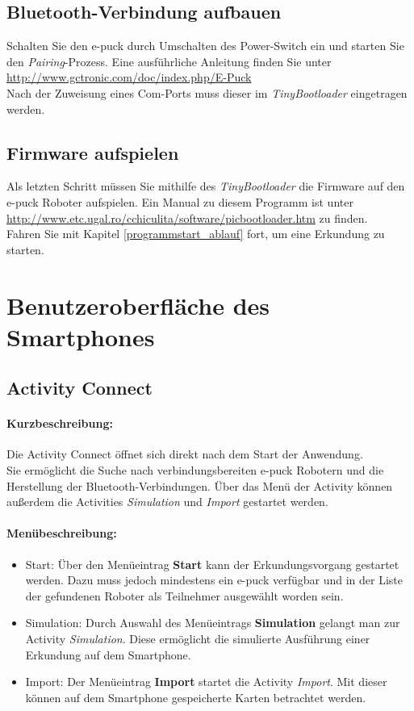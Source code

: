 \documentclass[10pt,a4paper]{article}
\let\oldsection\section
\renewcommand{\section}{\newpage \oldsection}
\begin{document}
			\subsection{Bluetooth-Verbindung aufbauen} 
				Schalten Sie den e-puck durch Umschalten des Power-Switch ein und starten Sie den \textit{Pairing}-Prozess. Eine ausf\"uhrliche Anleitung finden Sie
				unter  \url{http://www.gctronic.com/doc/index.php/E-Puck} \\
				Nach der Zuweisung eines Com-Ports muss dieser im \textit{TinyBootloader} eingetragen werden.			
			\subsection{Firmware aufspielen} 
				Als letzten Schritt m\"ussen Sie mithilfe des \textit{TinyBootloader} die Firmware auf den e-puck Roboter aufspielen. Ein Manual zu diesem Programm
				ist unter \url{http://www.etc.ugal.ro/cchiculita/software/picbootloader.htm} zu finden. \\
				Fahren Sie mit Kapitel \ref{programmstart_ablauf} fort, um eine Erkundung zu starten.
\section{Benutzeroberfl\"ache des Smartphones}
\label{benutzeroberflaeche}
	\subsection{Activity Connect}
		\paragraph*{Kurzbeschreibung:}
		Die Activity Connect \"offnet sich direkt nach dem Start der Anwendung. \\	
		Sie ermöglicht die Suche nach verbindungsbereiten e-puck Robotern und die Herstellung der Bluetooth-Verbindungen.
		Über das Men\"u der Activity können außerdem die Activities \textit{Simulation} und \textit{Import} gestartet werden.
		\paragraph*{Menübeschreibung:}
		\begin{itemize}
			\item Start: Über den Men\"ueintrag \textbf{Start} kann der Erkundungsvorgang gestartet werden. Dazu muss jedoch mindestens ein e-puck
			verf\"ugbar und in der Liste der gefundenen Roboter als Teilnehmer ausgew\"ahlt worden sein.
			\item Simulation: Durch Auswahl des Men\"ueintrags \textbf{Simulation} gelangt man zur Activity \textit{Simulation}. Diese erm\"oglicht
			die simulierte Ausf\"uhrung einer Erkundung auf dem Smartphone.
			\item Import: Der Men\"ueintrag \textbf{Import} startet die Activity \textit{Import}. Mit dieser k\"onnen auf dem Smartphone gespeicherte
			Karten betrachtet werden.
		\end{itemize}
\end{document}

